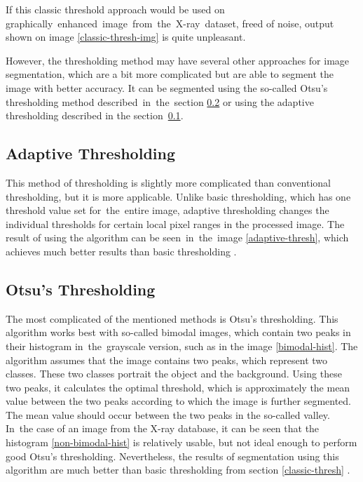 If this classic threshold approach would be used on graphically~enhanced~image~from~the~X-ray~dataset, freed of noise, output shown on image \ref{classic-thresh-img} is quite unpleasant.

However, the thresholding method may have several other approaches for image segmentation, which are a bit more complicated but are able to segment the image with better accuracy. It can be segmented using the so-called Otsu's thresholding method described~in~the~section \ref{Otsu} or using the adaptive thresholding described in the section~\ref{Adaptive}.

\subsection{Adaptive Thresholding}
\label{Adaptive}
This method of thresholding is slightly more complicated than conventional thresholding, but it is more applicable. Unlike basic thresholding, which has one threshold value set for~the~entire image, adaptive thresholding changes the individual thresholds for certain local pixel ranges in the processed image. The result of using the algorithm can be seen~in~the~image \ref{adaptive-thresh}, which achieves much better results than basic thresholding \cite{adaptive-threshold-opencv}. 

\subsection{Otsu's Thresholding}
\label{Otsu}
The most complicated of the mentioned methods is Otsu's thresholding. This algorithm works best with so-called bimodal images, which contain two peaks in their histogram in~the~grayscale version, such as in the image \ref{bimodal-hist}. The algorithm assumes that the image contains two peaks, which represent two classes. These two classes portrait the object and the background. Using these two peaks, it calculates the optimal threshold, which is approximately the mean value between the two peaks according to which the image is further segmented. The mean value should occur between the two peaks in the so-called valley. In~the case of an image from the X-ray database, it can be seen that the histogram \ref{non-bimodal-hist} is relatively usable, but not ideal enough to perform good Otsu's thresholding. Nevertheless, the results of segmentation using this algorithm are much better than basic thresholding from section \ref{classic-thresh} \cite{bimodal-image, adaptive-threshold-opencv}.

